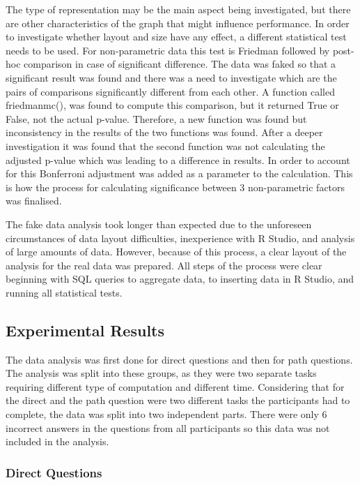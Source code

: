 \documentclass{l4proj}
\begin{document}
The type of representation may be the main aspect being investigated, but there are other characteristics of the graph that might influence performance. In order to investigate whether layout and size have any effect, a different statistical test needs to be used. For non-parametric data this test is Friedman followed by post-hoc comparison in case of significant difference. The data was faked so that a significant result was found and there was a need to investigate which are the pairs of comparisons significantly different from each other. A function called friedmanmc(), was found to compute this comparison, but it returned True or False, not the actual p-value. Therefore, a new function was found but inconsistency in the results of the two functions was found. After a deeper investigation it was found that the second function was not calculating the adjusted p-value which was leading to a difference in results. In order to account for this Bonferroni adjustment was added as a parameter to the calculation. This is how the process for calculating significance between 3  non-parametric factors was finalised. 

The fake data analysis took longer than expected due to the unforeseen circumstances of data layout difficulties, inexperience with R Studio, and analysis of large amounts of data. However, because of this process, a clear layout of the analysis for the real data was prepared. All steps of the process were clear beginning with SQL queries to aggregate data, to inserting data in R Studio, and running all statistical tests.

\subsection{Experimental Results}

The data analysis was first done for direct questions and then for path questions. The analysis was split into these groups, as they were two separate tasks requiring different type of computation and different time. Considering that for the direct and the path question were two different tasks the participants had to complete, the data was split into two independent parts. There were only 6 incorrect answers in the questions from all participants so this data was not included in the analysis.

\subsubsection{Direct Questions}
\end{document}
